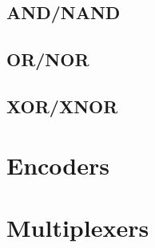 
\subsection{AND/NAND}

\subsection{OR/NOR}

\subsection{XOR/XNOR}

\section{Encoders}
\section{Multiplexers}

% 
% 
